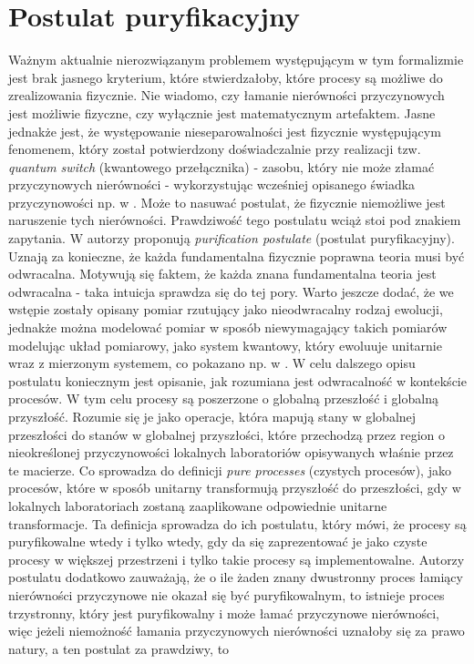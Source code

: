 \documentclass[10pt]{article} %
\begin{document}
\section{Postulat puryfikacyjny}
Ważnym aktualnie nierozwiązanym problemem występującym w tym formalizmie jest brak jasnego kryterium, które stwierdzałoby, które procesy są możliwe do zrealizowania fizycznie.
Nie wiadomo, czy łamanie nierówności przyczynowych jest możliwie fizyczne, czy wyłącznie jest matematycznym artefaktem. Jasne jednakże jest, że występowanie nieseparowalności jest fizycznie występującym fenomenem, który został potwierdzony doświadczalnie przy realizacji tzw. \textit{quantum switch}
(kwantowego przełącznika) - zasobu, który nie może złamać przyczynowych nierówności - wykorzystując wcześniej opisanego świadka przyczynowości np. w \cite{experiment}. Może to nasuwać postulat, że fizycznie niemożliwe jest naruszenie tych nierówności. Prawdziwość tego postulatu wciąż stoi pod znakiem zapytania. W \cite{purification} autorzy proponują \textit{purification postulate} (postulat puryfikacyjny). Uznają za konieczne, że każda fundamentalna fizycznie poprawna teoria
musi być odwracalna. Motywują się faktem, że każda znana fundamentalna teoria jest odwracalna - taka intuicja sprawdza się do tej pory.
Warto jeszcze dodać, że we wstępie zostały opisany pomiar rzutujący jako nieodwracalny rodzaj ewolucji, jednakże można modelować pomiar w sposób niewymagający takich pomiarów modelując układ pomiarowy, jako system kwantowy, który ewoluuje unitarnie wraz z mierzonym systemem, co pokazano np. w
\cite{reversible}. W celu dalszego opisu postulatu koniecznym jest opisanie, jak rozumiana jest odwracalność w kontekście procesów. W tym celu procesy są poszerzone o globalną przeszłość i globalną przyszłość. Rozumie się je jako operacje, która mapują stany w globalnej przeszłości do stanów w globalnej przyszłości, które przechodzą przez region o nieokreślonej przyczynowości lokalnych laboratoriów opisywanych właśnie przez te macierze. Co sprowadza do definicji \textit{pure processes} (czystych procesów), jako procesów, które w sposób unitarny transformują przyszłość do przeszłości, gdy w lokalnych laboratoriach zostaną zaaplikowane odpowiednie unitarne transformacje. Ta definicja sprowadza do ich postulatu, który mówi, że procesy są puryfikowalne wtedy i tylko wtedy, gdy da się zaprezentować je jako czyste procesy w większej przestrzeni i tylko takie procesy są implementowalne. Autorzy postulatu dodatkowo zauważają, że
o ile żaden znany dwustronny proces łamiący nierówności przyczynowe nie okazał się być puryfikowalnym, to istnieje proces trzystronny, który jest puryfikowalny i może łamać przyczynowe nierówności, więc jeżeli niemożność łamania przyczynowych nierówności uznałoby się za prawo natury, a ten postulat za prawdziwy, to
\end{document}
